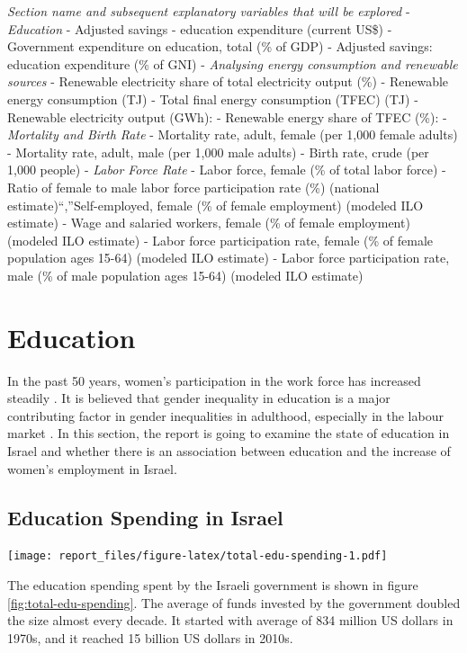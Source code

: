 \documentclass[11pt,a4paper,]{article}
\let\origfigure\figure
\let\endorigfigure\endfigure
\renewenvironment{figure}[1][2] {
    \expandafter\origfigure\expandafter[H]
} {
    \endorigfigure
}%
\begin{document}
\emph{Section name and subsequent explanatory variables that will be
explored} - \emph{Education} - Adjusted savings - education expenditure
(current US\$) - Government expenditure on education, total (\% of GDP)
- Adjusted savings: education expenditure (\% of GNI) - \emph{Analysing
energy consumption and renewable sources} - Renewable electricity share
of total electricity output (\%) - Renewable energy consumption (TJ) -
Total final energy consumption (TFEC) (TJ) - Renewable electricity
output (GWh): - Renewable energy share of TFEC (\%): - \emph{Mortality
and Birth Rate} - Mortality rate, adult, female (per 1,000 female
adults) - Mortality rate, adult, male (per 1,000 male adults) - Birth
rate, crude (per 1,000 people) - \emph{Labor Force Rate} - Labor force,
female (\% of total labor force) - Ratio of female to male labor force
participation rate (\%) (national estimate)``,''Self-employed, female
(\% of female employment) (modeled ILO estimate) - Wage and salaried
workers, female (\% of female employment) (modeled ILO estimate) - Labor
force participation rate, female (\% of female population ages 15-64)
(modeled ILO estimate) - Labor force participation rate, male (\% of
male population ages 15-64) (modeled ILO estimate)

\section*{Education}

In the past 50 years, women's participation in the work force has
increased steadily \autocite{stier2000women}. It is believed that gender
inequality in education is a major contributing factor in gender
inequalities in adulthood, especially in the labour market
\autocite{marks2008accounting}. In this section, the report is going to
examine the state of education in Israel and whether there is an
association between education and the increase of women's employment in
Israel.

\subsection*{Education Spending in Israel}

\begin{figure}
\centering
\texttt{[image: report\_files/figure-latex/total-edu-spending-1.pdf]}
\caption{\label{fig:total-edu-spending}Average Education Expenditure in
Israel by Decades}
\end{figure}

The education spending spent by the Israeli government is shown in
figure \ref{fig:total-edu-spending}. The average of funds invested by
the government doubled the size almost every decade. It started with
average of 834 million US dollars in 1970s, and it reached 15 billion US
dollars in 2010s.
\end{document}
